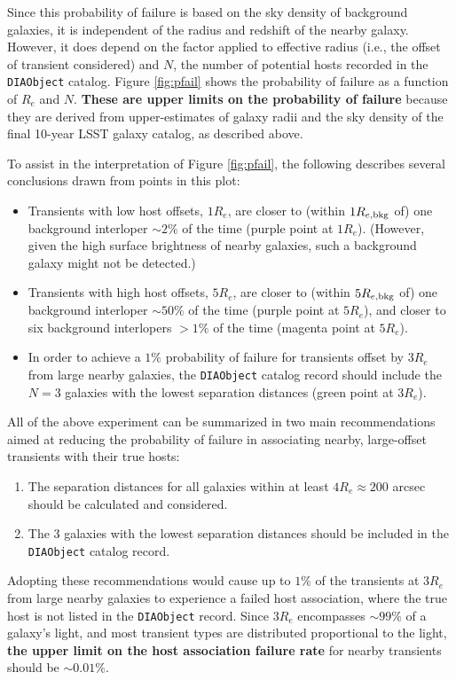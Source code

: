 Since this probability of failure is based on the sky density of background galaxies, it is independent of the radius and redshift of the nearby galaxy. 
However, it does depend on the factor applied to effective radius (i.e., the offset of transient considered) and $N$, the number of potential hosts recorded in the {\tt DIAObject} catalog.
Figure \ref{fig:pfail} shows the probability of failure as a function of $R_e$ and $N$.
\textbf{These are upper limits on the probability of failure} because they are derived from upper-estimates of galaxy radii and the sky density of the final 10-year LSST galaxy catalog, as described above. 

To assist in the interpretation of Figure \ref{fig:pfail}, the following describes several conclusions drawn from points in this plot:
\begin{itemize}
\item Transients with low host offsets, $1R_e$, are closer to (within $1R_{e,{\rm bkg}}$ of) one background interloper $\sim2\%$ of the time (purple point at $1R_e$). (However, given the high surface brightness of nearby galaxies, such a background galaxy might not be detected.)
\item Transients with high host offsets, $5R_e$, are closer to (within $5R_{e,{\rm bkg}}$ of) one background interloper $\sim50\%$ of the time (purple point at $5R_e$), and closer to six background interlopers $>1\%$ of the time (magenta point at $5R_e$).
\item In order to achieve a $1\%$ probability of failure for transients offset by $3R_e$ from large nearby galaxies, the {\tt DIAObject} catalog record should include the $N=3$ galaxies with the lowest separation distances (green point at $3R_e$).
\end{itemize} 

All of the above experiment can be summarized in two main recommendations aimed at reducing the probability of failure in associating nearby, large-offset transients with their true hosts:
\begin{enumerate}
\item The separation distances for all galaxies within at least $4R_e \approx 200$ arcsec should be calculated and considered.
\item The 3 galaxies with the lowest separation distances should be included in the {\tt DIAObject} catalog record.
\end{enumerate}
Adopting these recommendations would cause up to $1\%$ of the transients at $3R_e$ from large nearby galaxies to experience a failed host association, where the true host is not listed in the {\tt DIAObject} record.
Since $3R_e$ encompasses $\sim99\%$ of a galaxy's light, and most transient types are distributed proportional to the light, \textbf{the upper limit on the host association failure rate} for nearby transients should be $\sim0.01\%$.

